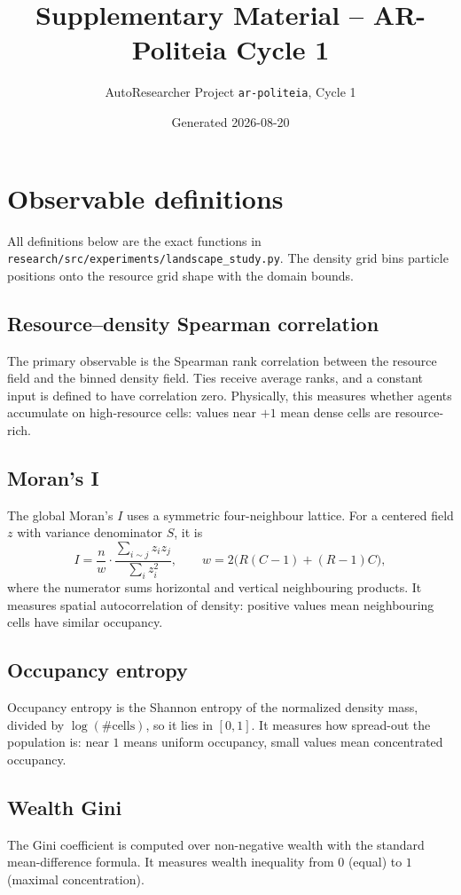 \documentclass[11pt,a4paper]{article}
\title{Supplementary Material -- AR-Politeia Cycle 1}
\author{AutoResearcher Project \texttt{ar-politeia}, Cycle 1}
\date{Generated 2026-08-20}
\newcommand{\code}[1]{\texttt{#1}}
\begin{document}
\maketitle

\section{Observable definitions}
\label{sec:observables}

All definitions below are the exact functions in
\code{research/src/experiments/landscape\_study.py}. The density grid bins
particle positions onto the resource grid shape with the domain bounds.

\subsection{Resource--density Spearman correlation}
The primary observable is the Spearman rank correlation between the resource
field and the binned density field. Ties receive average ranks, and a constant
input is defined to have correlation zero. Physically, this measures whether
agents accumulate on high-resource cells: values near $+1$ mean dense cells are
resource-rich.

\subsection{Moran's I}
The global Moran's $I$ uses a symmetric four-neighbour lattice. For a centered
field $z$ with variance denominator $S$, it is
\begin{equation}
I = \frac{n}{w}\cdot\frac{\sum_{i\sim j} z_i z_j}{\sum_i z_i^2},
\qquad w = 2\bigl(R(C-1)+(R-1)C\bigr),
\end{equation}
where the numerator sums horizontal and vertical neighbouring products. It
measures spatial autocorrelation of density: positive values mean neighbouring
cells have similar occupancy.

\subsection{Occupancy entropy}
Occupancy entropy is the Shannon entropy of the normalized density mass,
divided by $\log(\#\text{cells})$, so it lies in $[0,1]$. It measures how
spread-out the population is: near $1$ means uniform occupancy, small values
mean concentrated occupancy.

\subsection{Wealth Gini}
The Gini coefficient is computed over non-negative wealth with the standard
mean-difference formula. It measures wealth inequality from $0$ (equal) to
$1$ (maximal concentration).
\end{document}
